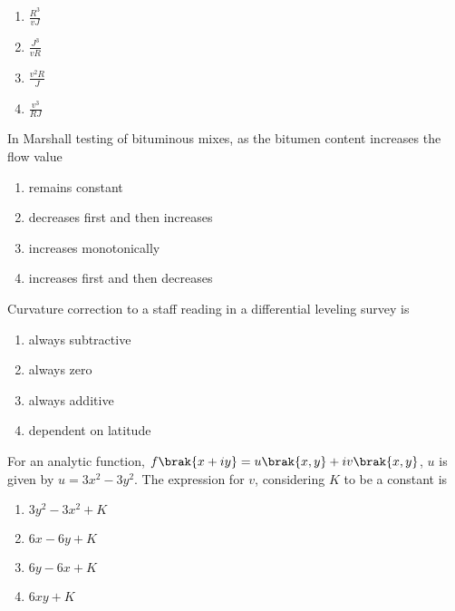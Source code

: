 	\begin{enumerate}
		\item $\frac{R^3}{vJ}$
		\item $\frac{J^3}{vR}$
		\item $\frac{v^2R}{J}$
		\item $\frac{v^3}{RJ}$
	\end{enumerate}


    \item In Marshall testing of bituminous mixes, as the bitumen content increases the flow value
	\hfill{}

	\begin{enumerate}
		\item remains constant
		\item decreases first and then increases
		\item increases monotonically
		\item increases first and then decreases
	\end{enumerate}


    \item Curvature correction to a staff reading in a differential leveling survey is
	\hfill{}

	\begin{enumerate}
		\item always subtractive
		\item always zero 
		\item always additive
		\item dependent on latitude
	\end{enumerate}

    \item For an analytic function, $f\brak{x + iy} = u\brak{x, y} + iv\brak{x, y}$, $u$ is given by $u = 3x^2 - 3y^2$. The expression for $v$, considering $K$ to be a constant is

	\hfill{}
	\begin{enumerate}
		\item $3y^2 - 3x^2 + K$
		\item $6x- 6y + K$
		\item $6y - 6x + K$
		\item $6xy + K$
	\end{enumerate}